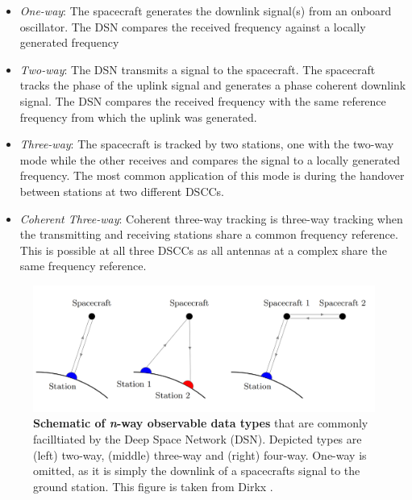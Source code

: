 \begin{itemize}
    \item \textit{One-way}: The spacecraft generates the downlink signal(s) from an
          onboard oscillator. The DSN compares the received frequency against a
          locally generated frequency
    \item \textit{Two-way}: The DSN transmits a signal to the spacecraft. The spacecraft
          tracks the phase of the uplink signal and generates a phase coherent
          downlink signal. The DSN compares the received frequency with the same
          reference frequency from which the uplink was generated.
    \item \textit{Three-way}: The spacecraft is tracked by two stations, one with the
          two-way mode while the other receives and compares the signal to a locally
          generated frequency. The most common application of this mode is during the
          handover between stations at two different DSCCs.
    \item \textit{Coherent Three-way}: Coherent three-way tracking is three-way tracking
          when the transmitting and receiving stations share a common frequency
          reference. This is possible at all three DSCCs as all antennas at a
          complex share the same frequency reference.
\end{itemize}

\begin{figure}[h]
    \centering
    \captionsetup{format=hang} %
    \includegraphics[width=0.85\linewidth]{graphics/n-way.PNG}
    \caption{
        \textbf{Schematic of \textit{n}-way observable data types} that are
        commonly facilltiated by the Deep Space Network (DSN). Depicted types
        are (left) two-way, (middle) three-way and (right) four-way. One-way is
        omitted, as it is simply the downlink of a spacecrafts signal to the
        ground station. This figure is taken from Dirkx \cite{Dirkx2015}.
    }
    \label{fig:n-way}
\end{figure}



